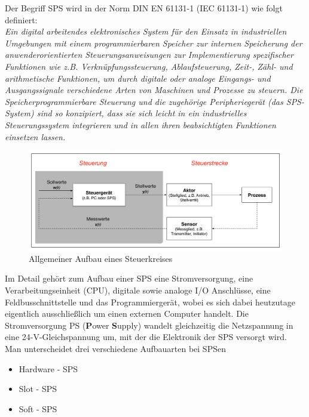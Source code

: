 	Der Begriff SPS wird in der Norm DIN EN 61131-1 (IEC 61131-1) wie folgt definiert:\\
	
	\glqq \textit{Ein digital arbeitendes elektronisches System für den Einsatz in industriellen Umgebungen mit einem programmierbaren Speicher zur internen Speicherung der anwenderorientierten Steuerungsanweisungen zur Implementierung spezifischer Funktionen wie z.B. Verknüpfungssteuerung, Ablaufsteuerung, Zeit-, Zähl- und arithmetische Funktionen, um durch digitale oder analoge Eingangs- und Ausgangssignale verschiedene Arten von Maschinen und Prozesse zu steuern. Die Speicherprogrammierbare Steuerung und die zugehörige Peripheriegerät (das SPS- System) sind so konzipiert, dass sie sich leicht in ein industrielles Steuerungssystem integrieren und in allen ihren beabsichtigten Funktionen einsetzen lassen.}\grqq \space \cite{sps_programmierung}\\
 
 	\begin{figure}[h!]
  		\centering
      	\includegraphics[width=1\textwidth]{graphics/stateoftheart/Aufbau_Steuerkreis_Selfmade.png}
  		\caption{Allgemeiner Aufbau eines Steuerkreises \cite{mseitz_sps}}
			\label{fig:Aufbau_Steuerkreis_Selfmade}
	\end{figure}	
 
 
 Im Detail gehört zum Aufbau einer SPS eine Stromversorgung, eine Verarbeitungseinheit (CPU), digitale sowie analoge I/O Anschlüsse, eine Feldbusschnittstelle und das Programmiergerät, wobei es sich dabei heutzutage eigentlich ausschließlich um einen externen Computer handelt. Die Stromversorgung PS (\textbf{P}ower \textbf{S}upply) wandelt gleichzeitig die Netzspannung in eine 24-V-Gleichspannung um, mit der die Elektronik der SPS versorgt wird.\\
	
	Man unterscheidet drei verschiedene Aufbauarten bei SPSen
	
	\begin{itemize}
  		\item Hardware - SPS
  		\item Slot - SPS
  		\item Soft - SPS
	\end{itemize}

